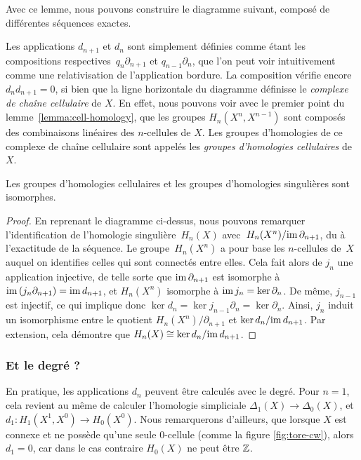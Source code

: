Avec ce lemme, nous pouvons construire le diagramme suivant, composé de différentes séquences exactes.

\scalebox{0.7}{

}


Les applications $d_{n+1}$ et $d_n$ sont simplement définies comme étant les compositions respectives~$q_n\partial_{n+1}$ et $q_{n-1}\partial_n$, que l'on peut voir intuitivement comme une relativisation de l'application bordure. La composition vérifie encore $d_nd_{n+1}=0$, si bien que la ligne horizontale du diagramme définisse le \emph{complexe de chaîne cellulaire} de $X$. En effet, nous pouvons voir avec le premier point du lemme~\ref{lemma:cell-homology}, que les groupes $H_n(X^n,X^{n-1})$ sont composés des combinaisons linéaires des $n$-cellules de $X$. Les groupes d'homologies de ce complexe de chaîne cellulaire sont appelés les \emph{groupes d'homologies cellulaires} de $X$.

\begin{theorem}
Les groupes d'homologies cellulaires et les groupes d'homologies singulières sont isomorphes.
\end{theorem}
\begin{proof}
En reprenant le diagramme ci-dessus, nous pouvons remarquer l'identification de l'homologie singulière~$H_n(X)$ avec~$H_n(X^n)/\mathrm{im}\,\partial_{n+1}$, du à l'exactitude de la séquence. Le groupe~$H_n(X^n)$ a pour base les $n$-cellules de~$X$ auquel on identifies celles qui sont connectés entre elles. Cela fait alors de $j_n$ une application injective, de telle sorte que $\mathrm{im}\,\partial_{n+1}$ est isomorphe à $\mathrm{im}\,(j_n\partial_{n+1})=\mathrm{im}\, d_{n+1}$, et $H_n(X^n)$ isomorphe à $\mathrm{im}\, j_n=\ker\partial_n$. De même, $j_{n-1}$ est injectif, ce qui implique donc $\ker d_n=\ker j_{n-1}\partial_n=\ker\partial_n$. Ainsi, $j_n$ induit un isomorphisme entre le quotient $H_n(X^n)/\partial_{n+1}$ et $\ker d_n/\mathrm{im}\, d_{n+1}$. Par extension, cela démontre que $H_n(X)\cong \ker d_n/\mathrm{im}\, d_{n+1}$.
\end{proof}

\subsubsection{Et le degré ?}

En pratique, les applications $d_n$ peuvent être calculés avec le degré. Pour $n=1$, cela revient au même de calculer l'homologie simpliciale $\Delta_1(X)\to\Delta_0(X)$, et $d_1:H_1(X^1,X^0)\to H_0(X^0)$. Nous remarquerons d'ailleurs, que lorsque $X$ est connexe et ne possède qu'une seule 0-cellule (comme la figure \ref{fig:tore-cw}), alors $d_1=0$, car dans le cas contraire $H_0(X)$ ne peut être $\mathbb{Z}$.

